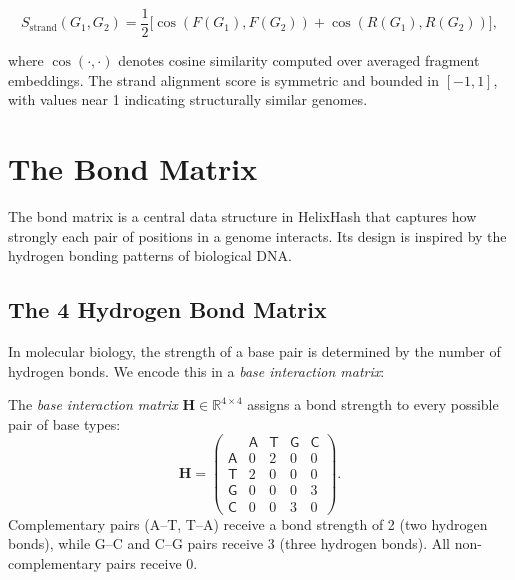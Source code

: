 \begin{equation}
S_{\text{strand}}(G_1, G_2) = \frac{1}{2}\bigl[\cos(F(G_1), F(G_2)) + \cos(R(G_1), R(G_2))\bigr],
\label{eq:strand-alignment}
\end{equation}

where $\cos(\cdot, \cdot)$ denotes cosine similarity computed over averaged fragment embeddings. The strand alignment score is symmetric and bounded in $[-1, 1]$, with values near 1 indicating structurally similar genomes.

\section{The Bond Matrix}
\label{sec:bond-matrices}

The bond matrix is a central data structure in HelixHash that captures how strongly each pair of positions in a genome interacts. Its design is inspired by the hydrogen bonding patterns of biological DNA.

\subsection{The 4 Hydrogen Bond Matrix}
\label{subsec:hydrogen-bond-matrix}

In molecular biology, the strength of a base pair is determined by the number of hydrogen bonds. We encode this in a \emph{base interaction matrix}:

\begin{definition}
\label{def:base-interaction}
The \emph{base interaction matrix} $\mathbf{H} \in \mathbb{R}^{4 \times 4}$ assigns a bond strength to every possible pair of base types:
\begin{equation}
\mathbf{H} =
\begin{pmatrix}
 & \mathsf{A} & \mathsf{T} & \mathsf{G} & \mathsf{C} \\
\mathsf{A} & 0 & 2 & 0 & 0 \\
\mathsf{T} & 2 & 0 & 0 & 0 \\
\mathsf{G} & 0 & 0 & 0 & 3 \\
\mathsf{C} & 0 & 0 & 3 & 0
\end{pmatrix}.
\label{eq:hydrogen-bond-matrix}
\end{equation}
Complementary pairs (A--T, T--A) receive a bond strength of 2 (two hydrogen bonds), while G--C and C--G pairs receive 3 (three hydrogen bonds). All non-complementary pairs receive 0.
\end{definition}

